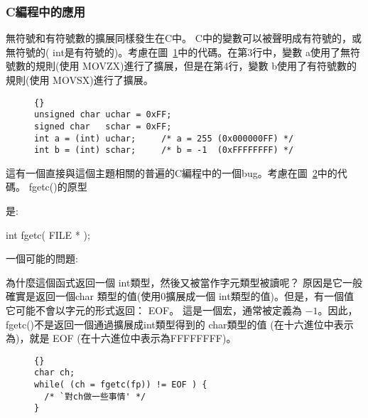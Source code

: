 \subsubsection{C編程中的應用}

無符號和有符號數的擴展同樣發生在C中。 C中的變數可以被聲明成有符號的，或無符號的({\code
int}是有符號的)。考慮在圖~\ref{fig:charExt}中的代碼。在第3行中，變數{\code
a}使用了無符號數的規則(使用{\code
MOVZX})進行了擴展，但是在第4行，變數{\code
b}使用了有符號數的規則(使用 {\code MOVSX})進行了擴展。

\begin{figure}[t]
\begin{lstlisting}[frame=tlrb]{}
unsigned char uchar = 0xFF;
signed char   schar = 0xFF;
int a = (int) uchar;     /* a = 255 (0x000000FF) */
int b = (int) schar;     /* b = -1  (0xFFFFFFFF) */
\end{lstlisting}
\caption{}
\label{fig:charExt}
\end{figure}

這有一個直接與這個主題相關的普遍的C編程中的一個bug。考慮在圖~\ref{fig:IObug}中的代碼。
{\code fgetc()}的原型{\samepage 是:
\begin{CodeQuote}
int fgetc( FILE * );
\end{CodeQuote}
一個可能的問題:}為什麼這個函式返回一個{\code
int}類型，然後又被當作字元類型被讀呢？
原因是它一般確實是返回一個{\code char}
類型的值(使用0擴展成一個{\code
int}類型的值)。但是，有一個值它可能不會以字元的形式返回：{\code
EOF}。 這是一個宏，通常被定義為 $-1$。因此，{\code
fgetc()}不是返回一個通過擴展成{\code int}類型得到的{\code
char}類型的值 (在十六進位中表示為{})，就是{\code
EOF} (在十六進位中表示為{\code FFFFFFFF})。

\begin{figure}[t]
\lstset{escapeinside=`',language=Pascal,%
}
\begin{lstlisting}[stepnumber=0,frame=tlrb]{}
char ch;
while( (ch = fgetc(fp)) != EOF ) {
  /* `對ch做一些事情' */
}
\end{lstlisting}
\caption{} \label{fig:IObug}
\end{figure}

